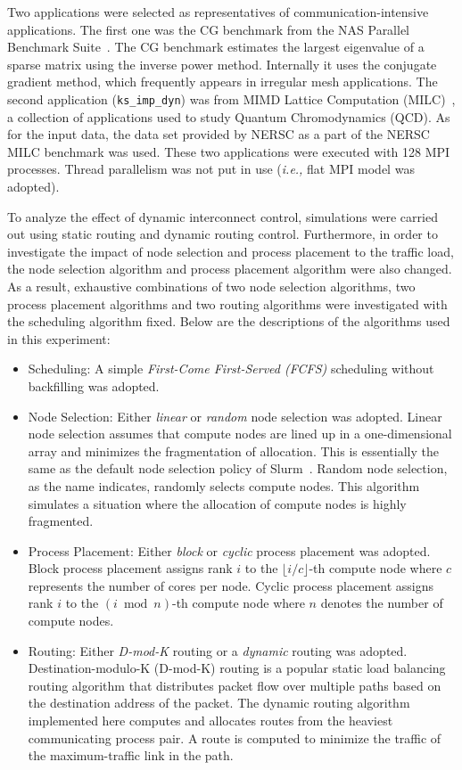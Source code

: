 Two applications were selected as representatives of communication-intensive
applications. The first one was the CG benchmark from the NAS Parallel
Benchmark Suite~\autocite{Bailey1991}. The CG benchmark estimates the largest
eigenvalue of a sparse matrix using the inverse power method. Internally it
uses the conjugate gradient method, which frequently appears in irregular mesh
applications. The second application (\lstinline!ks_imp_dyn!) was from MIMD
Lattice Computation (MILC)~\autocite{milc}, a collection of applications used
to study Quantum Chromodynamics (QCD). As for the input data, the data set
provided by NERSC as a part of the NERSC MILC benchmark was used. These two
applications were executed with 128 MPI processes. Thread parallelism was not
put in use (\emph{i.e.,} flat MPI model was adopted).

To analyze the effect of dynamic interconnect control, simulations were
carried out using static routing and dynamic routing control. Furthermore, in
order to investigate the impact of node selection and process placement to the
traffic load, the node selection algorithm and process placement algorithm
were also changed. As a result, exhaustive combinations of two node selection
algorithms, two process placement algorithms and two routing algorithms were
investigated with the scheduling algorithm fixed. Below are the descriptions
of the algorithms used in this experiment:

\begin{itemize}
\item
  Scheduling: A simple \emph{First-Come First-Served (FCFS)} scheduling
  without backfilling was adopted.
\item
  Node Selection: Either \emph{linear} or \emph{random} node selection
  was adopted. Linear node selection assumes that compute nodes are
  lined up in a one-dimensional array and minimizes the fragmentation of
  allocation. This is essentially the same as the default node selection
  policy of Slurm~\autocite{Yoo2003}. Random node selection, as the name
  indicates, randomly selects compute nodes. This algorithm simulates a
  situation where the allocation of compute nodes is highly fragmented.
\item
  Process Placement: Either \emph{block} or \emph{cyclic} process
  placement was adopted. Block process placement assigns rank \(i\) to
  the \(\lfloor i / c \rfloor\)-th compute node where \(c\) represents
  the number of cores per node. Cyclic process placement assigns rank
  \(i\) to the \((i \bmod n)\)-th compute node where \(n\) denotes the
  number of compute nodes.
\item
  Routing: Either \emph{D-mod-K} routing or a \emph{dynamic} routing was
  adopted. Destination-modulo-K (\mbox{D-mod-K}) routing is a
  popular static load balancing routing algorithm that distributes
  packet flow over multiple paths based on the destination address of
  the packet. The dynamic routing algorithm implemented here computes
  and allocates routes from the heaviest communicating process pair. A
  route is computed to minimize the traffic of the maximum-traffic link
  in the path.
\end{itemize}

